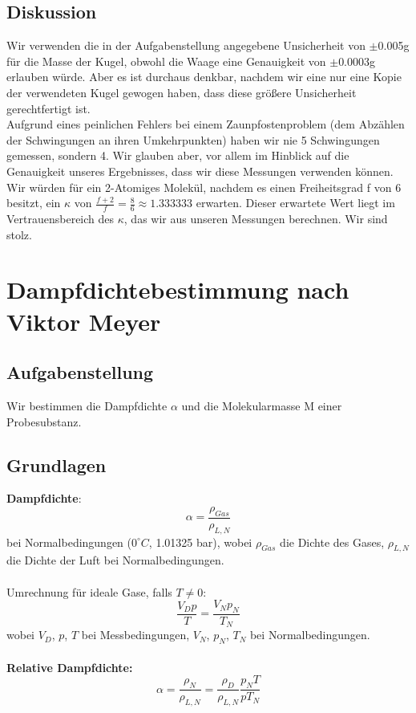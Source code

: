 \documentclass{article}
\begin{document}
\subsection{Diskussion}
Wir verwenden die in der Aufgabenstellung angegebene Unsicherheit von $\pm$0.005g für die Masse der Kugel, obwohl die Waage eine Genauigkeit von $\pm$0.0003g erlauben würde. Aber es ist durchaus denkbar, nachdem wir eine nur eine Kopie der verwendeten Kugel gewogen haben, dass diese größere Unsicherheit gerechtfertigt ist. \\ 
Aufgrund eines peinlichen Fehlers bei einem Zaunpfostenproblem (dem Abzählen der Schwingungen an ihren Umkehrpunkten) haben wir nie 5 Schwingungen gemessen, sondern 4. Wir glauben aber, vor allem im Hinblick auf die Genauigkeit unseres Ergebnisses, dass wir diese Messungen verwenden können. \\ 
Wir würden für ein 2-Atomiges Molekül, nachdem es einen Freiheitsgrad f von 6 besitzt, ein $\kappa$ von $\frac{f+2}{f}=\frac{8}{6}\approx1.333333$ erwarten. Dieser erwartete Wert liegt im Vertrauensbereich des $\kappa$, das wir aus unseren Messungen berechnen. Wir sind stolz.
\newpage
\section{Dampfdichtebestimmung nach Viktor Meyer}
\subsection{Aufgabenstellung}
Wir bestimmen die Dampfdichte $\alpha$ und die Molekularmasse M einer Probesubstanz. 
\subsection{Grundlagen}
\textbf{Dampfdichte}: 
\begin{equation}
\label{dampfdichte_norm}
\alpha=\frac{\rho_{Gas}}{\rho_{L,N}}
\end{equation}
bei Normalbedingungen ($0^\circ C$, 1.01325 bar), wobei $\rho_{Gas}$ die Dichte des Gases, $\rho_{L,N}$ die Dichte der Luft bei Normalbedingungen.\\
\\
Umrechnung für ideale Gase, falls $T\neq 0$:
\begin{equation}
\frac{V_Dp}{T}=\frac{V_Np_N}{T_N}
\end{equation}
wobei $V_D$, $p$, $T$ bei Messbedingungen, $V_N$, $p_N$, $T_N$ bei Normalbedingungen.\\
\\
\textbf{Relative Dampfdichte:}
\begin{equation}
\label{dampfdichte_rel}
\alpha=\frac{\rho_N}{\rho_{L,N}}=\frac{\rho_D}{\rho_{L,N}}\frac{p_NT}{pT_N}
\end{equation}
\end{document}

